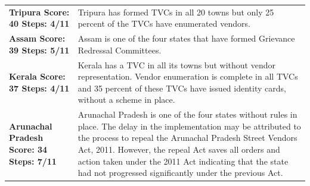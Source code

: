 \documentclass[a4paper, 12pt, twoside]{article}
\begin{document}
{\begin{longtable}[l]{>{\raggedright}p{4cm}>{\raggedright\arraybackslash}p{10cm}}
\\
\cellcolor{SVACyellow1}\bf{Tripura}
\newline
\bf{Score: 40}
\newline
\bf{Steps: 4/11}
&
\cellcolor{SVACyellow2}Tripura has formed TVCs in all 20 towns but only 25 percent of the TVCs have enumerated vendors.
\\
\cellcolor{SVACyellow1}\bf{Assam}
\newline
\bf{Score: 39}
\newline
\bf{Steps: 5/11}
&
\cellcolor{SVACyellow2}Assam is one of the four states that have formed Grievance Redressal Committees.
\\
\cellcolor{SVACyellow1}\bf{Kerala}
\newline
\bf{Score: 37}
\newline
\bf{Steps: 4/11}
&
\cellcolor{SVACyellow2}Kerala has a TVC in all its towns but without vendor representation. Vendor enumeration is complete in all TVCs and 35 percent of these TVCs have issued identity cards, without a scheme in place.
\\
\cellcolor{SVACyellow1}\bf{Arunachal Pradesh}
\newline
\bf{Score: 34}
\newline
\bf{Steps: 7/11}
&
\cellcolor{SVACyellow2}Arunachal Pradesh is one of the four states without rules in place. The delay in the implementation may be attributed to the process to repeal the Arunachal Pradesh Street Vendors Act, 2011. However, the repeal Act saves all orders and action taken under the 2011 Act indicating that the state had not progressed significantly under the previous Act. %


\end{longtable}}
\end{document}
